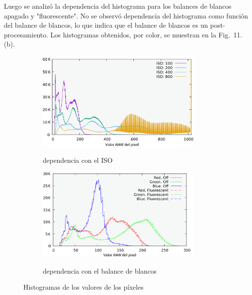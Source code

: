 \documentclass[twoside,twocolumn]{article}
\begin{document}
    Luego se analizó la dependencia del histograma para los balances de blancos apagado y "fluorescente".
    No se observó dependencia del histograma como función del balance de blancos,
    lo que indica que el balance de blancos es un post-procesamiento.
    Los histogramas obtenidos, por color, se muestran en la Fig.~11.(b).

    \begin{figure}[h]
      \centering
      \begin{subfigure}{.47\textwidth}
        \includegraphics[width=0.9\textwidth]{figures/ISO.png}
        \label{fig:ISO}
        \caption{dependencia con el ISO}
      \end{subfigure}
      \begin{subfigure}{.47\textwidth}
        \includegraphics[width=0.9\textwidth]{figures/WB_component_transparent.png}
        \label{fig:WB}
        \caption{dependencia con el balance de blancos}
      \end{subfigure}
      \caption{Histogramas de los valores de los píxeles}
      \label{fig:histo_picamera}
    \end{figure}

\end{document}
